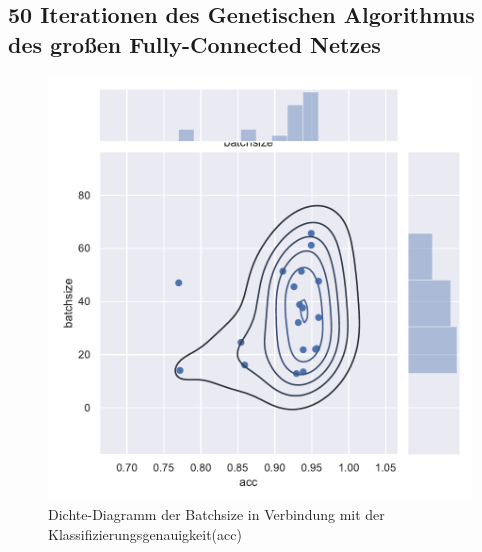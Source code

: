 \subsection{50 Iterationen des Genetischen Algorithmus des großen Fully-Connected Netzes}
\begin{figure}[H]
  \centering  
  \includegraphics[scale=0.5]{anhang/GA_50_mnist_digits_True_big_jointplot_batchsize.pdf}
  \caption{Dichte-Diagramm der Batchsize in Verbindung mit der Klassifizierungsgenauigkeit(acc)}
  
\end{figure}

